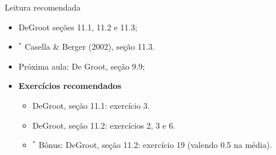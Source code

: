 \begin{frame}{Leitura recomendada}
\begin{itemize}
 \item[\faBook] DeGroot seções 11.1, 11.2 e 11.3;
 \item[\faBook] $^\ast$ Casella \& Berger (2002), seção 11.3.
 \item[\faForward] Próxima aula: De Groot, seção 9.9;
 \item {\large\textbf{Exercícios recomendados}}
  \begin{itemize}
   \item[\faBookmark] DeGroot, seção 11.1: exercício 3.
   \item[\faBookmark] DeGroot, seção 11.2: exercícios 2, 3 e 6.
   \item[\faBookmark] $^\ast$ Bônus: DeGroot, seção 11.2: exercício  19 (valendo 0.5 na média).
  \end{itemize}
 \end{itemize} 
\end{frame}
